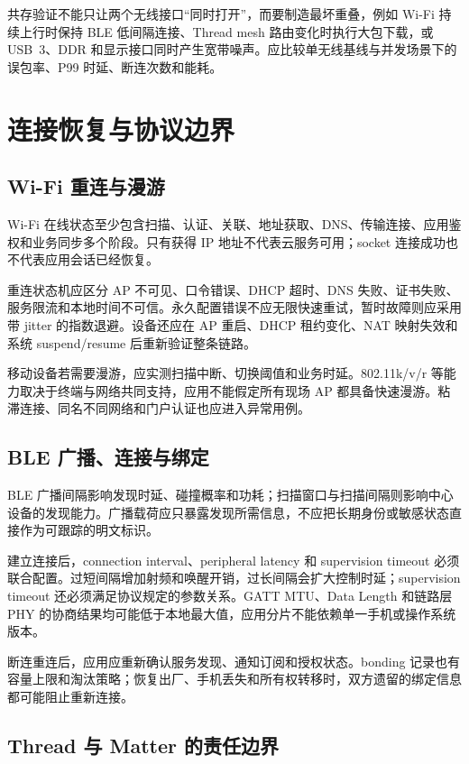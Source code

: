 共存验证不能只让两个无线接口“同时打开”，而要制造最坏重叠，例如 Wi-Fi 持续上行时保持 BLE 低间隔连接、Thread mesh 路由变化时执行大包下载，或 USB~3、DDR 和显示接口同时产生宽带噪声。应比较单无线基线与并发场景下的误包率、P99 时延、断连次数和能耗。

\section{连接恢复与协议边界}

\subsection{Wi-Fi 重连与漫游}

Wi-Fi 在线状态至少包含扫描、认证、关联、地址获取、DNS、传输连接、应用鉴权和业务同步多个阶段。只有获得 IP 地址不代表云服务可用；socket 连接成功也不代表应用会话已经恢复。

重连状态机应区分 AP 不可见、口令错误、DHCP 超时、DNS 失败、证书失败、服务限流和本地时间不可信。永久配置错误不应无限快速重试，暂时故障则应采用带 jitter 的指数退避。设备还应在 AP 重启、DHCP 租约变化、NAT 映射失效和系统 suspend/resume 后重新验证整条链路。

移动设备若需要漫游，应实测扫描中断、切换阈值和业务时延。802.11k/v/r 等能力取决于终端与网络共同支持，应用不能假定所有现场 AP 都具备快速漫游。粘滞连接、同名不同网络和门户认证也应进入异常用例。

\subsection{BLE 广播、连接与绑定}

BLE 广播间隔影响发现时延、碰撞概率和功耗；扫描窗口与扫描间隔则影响中心设备的发现能力。广播载荷应只暴露发现所需信息，不应把长期身份或敏感状态直接作为可跟踪的明文标识。

建立连接后，connection interval、peripheral latency 和 supervision timeout 必须联合配置。过短间隔增加射频和唤醒开销，过长间隔会扩大控制时延；supervision timeout 还必须满足协议规定的参数关系。GATT MTU、Data Length 和链路层 PHY 的协商结果均可能低于本地最大值，应用分片不能依赖单一手机或操作系统版本。

断连重连后，应用应重新确认服务发现、通知订阅和授权状态。bonding 记录也有容量上限和淘汰策略；恢复出厂、手机丢失和所有权转移时，双方遗留的绑定信息都可能阻止重新连接。

\subsection{Thread 与 Matter 的责任边界}

